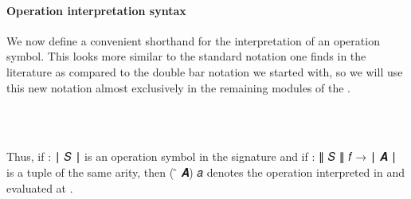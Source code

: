 


\paragraph*{Operation interpretation syntax}\label{operation-interpretation-syntax}

We now define a convenient shorthand for the interpretation of an operation symbol. This looks more similar to the standard notation one finds in the literature as compared to the double bar notation we started with, so we will use this new notation almost exclusively in the remaining modules of the \ualib.
\ccpad
\begin{code}%
\>[1]\AgdaSpace{}%
\AgdaSymbol{:}\AgdaSpace{}%
\AgdaSymbol{(}\AgdaSpace{}%
\AgdaSymbol{:}\AgdaSpace{}%
\AgdaSpace{}%
\AgdaSpace{}%
\AgdaSymbol{)(}\AgdaSpace{}%
\AgdaSymbol{:}\AgdaSpace{}%
\AgdaSpace{}%
\AgdaSpace{}%
\AgdaSymbol{)}\AgdaSpace{}%
\AgdaSpace{}%
\AgdaSymbol{(}\AgdaSpace{}%
\AgdaSpace{}%
\AgdaSpace{}%
%
\>[48]%
\>[51]\AgdaSpace{}%
\AgdaSpace{}%
\AgdaSymbol{)}\AgdaSpace{}%
\AgdaSpace{}%
\AgdaSpace{}%
\AgdaSpace{}%
\<%
\\
%
\\[\AgdaEmptyExtraSkip]%
%
\>[1]\AgdaSpace{}%
\AgdaSpace{}%
\AgdaSpace{}%
\AgdaSymbol{=}\AgdaSpace{}%
\AgdaSpace{}%
\AgdaSpace{}%
\AgdaSpace{}%
\AgdaSymbol{(}\AgdaSpace{}%
\AgdaSpace{}%
\AgdaSpace{}%
\AgdaSymbol{)}\AgdaSpace{}%
\<%
\end{code}
\ccpad
Thus, if  \as : \af ∣ \ab 𝑆 \af ∣ is an operation symbol in the signature  and if  \as : \af ∥ \ab 𝑆 \af ∥ \ab 𝑓 \as → \af ∣ \ab 𝑨 \af ∣ is a tuple of the same arity, then ( \af ̂ \ab 𝑨) \ab 𝑎 denotes the operation  interpreted in  and evaluated at .


